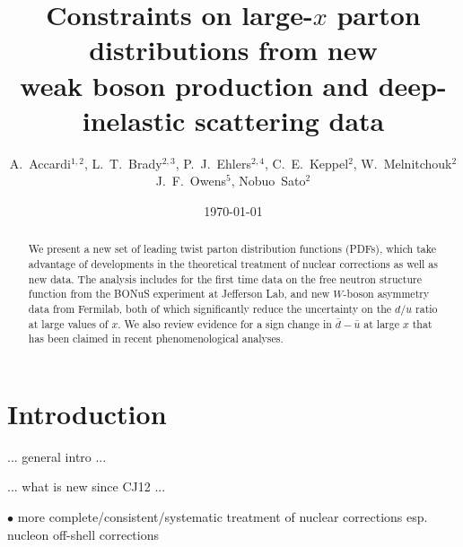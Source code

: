 \documentclass[aps,prd,amsmath,preprint]{revtex4}
\begin{document}
\title{Constraints on large-$x$ parton distributions from new \\
	weak boson production and deep-inelastic scattering data}

\author{A.~Accardi$^{1,2}$,
	L.~T.~Brady$^{2,3}$,
	P.~J.~Ehlers$^{2,4}$,
	C.~E.~Keppel$^2$,
	W.~Melnitchouk$^2$
	J.~F.~Owens$^5$,
	Nobuo~Sato$^2$}



\date{\today}

\begin{abstract}
We present a new set of leading twist parton distribution functions
(PDFs), which take advantage of developments in the theoretical
treatment of nuclear corrections as well as new data.
The analysis includes for the first time data on the free neutron
structure function from the BONuS experiment at Jefferson Lab,
and new $W$-boson asymmetry data from Fermilab, both of which
significantly reduce the uncertainty on the $d/u$ ratio at large
values of $x$.
We also review evidence for a sign change in $\bar d-\bar u$ at
large $x$ that has been claimed in recent phenomenological analyses.
\end{abstract}

\maketitle


\section{Introduction}
\label{sec:intro}

... general intro ...

... what is new since CJ12 ...

$\bullet$
more complete/consistent/systematic treatment of nuclear corrections
esp. nucleon off-shell corrections
\end{document}

